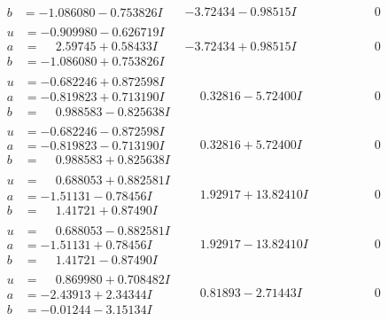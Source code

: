\documentclass[1p]{elsarticle_modified}
\theoremstyle{definition}
\begin{document}
$$\begin{array}{c|c|c}
\begin{aligned}
b &= -1.086080 - 0.753826 I\end{aligned}
 & -3.72434 - 0.98515 I & \phantom{-0.000000 } 0 \\ \hline\begin{aligned}
u &= -0.909980 - 0.626719 I \\
a &= \phantom{-}2.59745 + 0.58433 I \\
b &= -1.086080 + 0.753826 I\end{aligned}
 & -3.72434 + 0.98515 I & \phantom{-0.000000 } 0 \\ \hline\begin{aligned}
u &= -0.682246 + 0.872598 I \\
a &= -0.819823 + 0.713190 I \\
b &= \phantom{-}0.988583 - 0.825638 I\end{aligned}
 & \phantom{-}0.32816 - 5.72400 I & \phantom{-0.000000 } 0 \\ \hline\begin{aligned}
u &= -0.682246 - 0.872598 I \\
a &= -0.819823 - 0.713190 I \\
b &= \phantom{-}0.988583 + 0.825638 I\end{aligned}
 & \phantom{-}0.32816 + 5.72400 I & \phantom{-0.000000 } 0 \\ \hline\begin{aligned}
u &= \phantom{-}0.688053 + 0.882581 I \\
a &= -1.51131 - 0.78456 I \\
b &= \phantom{-}1.41721 + 0.87490 I\end{aligned}
 & \phantom{-}1.92917 + 13.82410 I & \phantom{-0.000000 } 0 \\ \hline\begin{aligned}
u &= \phantom{-}0.688053 - 0.882581 I \\
a &= -1.51131 + 0.78456 I \\
b &= \phantom{-}1.41721 - 0.87490 I\end{aligned}
 & \phantom{-}1.92917 - 13.82410 I & \phantom{-0.000000 } 0 \\ \hline\begin{aligned}
u &= \phantom{-}0.869980 + 0.708482 I \\
a &= -2.43913 + 2.34344 I \\
b &= -0.01244 - 3.15134 I\end{aligned}
 & \phantom{-}0.81893 - 2.71443 I & \phantom{-0.000000 } 0 \\ \hline\begin{aligned}

\end{aligned}
\end{array}$$
\end{document}
